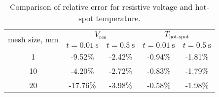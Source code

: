  \begin{table}[H]
    \caption{Comparison of relative error for resistive voltage and hot-spot temperature.} 
    \vspace{-1.em} 
    \fontsize{10}{10}
    \selectfont 
    \renewcommand{\arraystretch}{1.5}
    \begin{center}
        \begin{tabular}{ | c | cc | cc | }  
        \hline
        \multirow{2}{*}{mesh size, mm} & \multicolumn{2}{c|}{$V_\text{res}$} & \multicolumn{2}{c|}{$T_\text{hot-spot}$} \\ 
           & $t=0.01~\text{s}$ & $t=0.5~\text{s}$ & $t=0.01~\text{s}$ & $t=0.5~\text{s}$ \\
        \hline
        1 & -9.52\% & -2.42\% & -0.94\% & -1.81\% \\
        10 & -4.20\% & -2.72\% & -0.83\% & -1.79\% \\
        20 & -17.76\% & -3.98\% & -0.58\% & -1.98\% \\
        \hline 
        \end{tabular}
    \end{center}  
     \label{table: 1d_qv_benchmarking_with_insulation_res_and_hot_spot_error_conclusion} 
 \end{table}